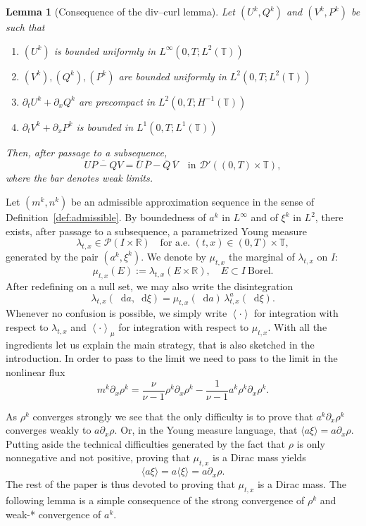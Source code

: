 \documentclass[a4paper,twosided,11pt]{article}
\newcommand{\R}{\mathbb{R}}
\newcommand{\T}{\mathbb{T}}
\newcommand{\la}{\lambda}
\newcommand{\p}{\partial}
\newcommand{\av}[1]{\left\langle #1 \right\rangle}
\newcommand{\avmu}[1]{\left\langle #1 \right\rangle_{\mu}}
\newcommand{\1}{\mathbf{1}}
\theoremstyle{plain}
\newtheorem{lemma}[thm]{Lemma}
\theoremstyle{remark}
\newcommand{\diff}{\mathop{} \mathrm{d}}
\numberwithin{equation}{section}
\begin{document}
\begin{lemma}[Consequence of the div--curl lemma]
\label{lem:tartar}
Let $(U^k,Q^k)$ and $(V^k,P^k)$ be such that 
\begin{enumerate}
    \item $(U^k)$ is bounded uniformly in $L^\infty(0,T; L^{2}(\T))$
    \item $(V^k), (Q^k), (P^k)$ are bounded uniformly in $L^2(0,T; L^{2}(\T))$
    \item $\p_t U^k+\p_x Q^k$ are precompact in $L^2(0,T; H^{-1}(\T))$
    \item $\p_t V^k+\p_x P^k$ is bounded in $L^1(0,T; L^{1}(\T))$
\end{enumerate}
Then, after passage to a subsequence,
\begin{equation}
\label{eq:tartar-identity}
 \overline{U P-Q V}=\overline U\, \overline P-\overline Q\, \overline V
 \quad \text{in } \mathcal D'((0,T)\times\T),
\end{equation}
where the bar denotes weak limits.
\end{lemma}


Let $(m^k,n^k)$ be an admissible approximation sequence in the sense of Definition~\ref{def:admissible}. By boundedness of $a^k$ in $L^\infty$ and of $\xi^k$ in $L^2$, there exists, after passage to a subsequence, a parametrized Young measure
$$
 \la_{t,x}\in \mathcal P(I\times\R)
 \quad \text{for a.e. } (t,x)\in (0,T)\times\T,
$$
generated by the pair $(a^k,\xi^k)$. We denote by $\mu_{t,x}$ the marginal of $\la_{t,x}$ on $I$:
$$
 \mu_{t,x}(E):=\la_{t,x}(E\times \R),
 \quad E\subset I\ \text{Borel}.
$$
After redefining on a null set, we may also write the disintegration
$$
 \la_{t,x}(\diff a,\diff\xi)=\mu_{t,x}(\diff a)\,\la^a_{t,x}(\diff\xi).
$$
Whenever no confusion is possible, we simply write $\av{\cdot}$ for integration with respect to $\la_{t,x}$ and $\avmu{\cdot}$ for integration with respect to $\mu_{t,x}$. With all the ingredients let us explain the main strategy, that is also sketched in the introduction. In order to pass to the limit we need to pass to the limit in the nonlinear flux
$$
m^k\partial_x\rho^k = \frac{\nu}{\nu-1}\rho^k\partial_x\rho^k - \frac{1}{\nu-1}a^k\rho^k\partial_x\rho^k.
$$

As $\rho^k$ converges strongly we see that the only difficulty is to prove that $a^k\partial_x\rho^k$ converges weakly to $a\partial_x\rho$. Or, in the Young measure language, that $\langle a \xi\rangle = a\partial_x\rho$. Putting aside the technical difficulties generated by the fact that $\rho$ is only nonnegative and not positive, proving that $\mu_{t,x}$ is a Dirac mass yields 
$$
\langle a\xi\rangle = a\langle\xi\rangle = a\partial_x\rho.
$$
The rest of the paper is thus devoted to proving that $\mu_{t,x}$ is a Dirac mass.
The following lemma is a simple consequence of the strong convergence of $\rho^k$ and weak-* convergence of $a^k$.
\end{document}
